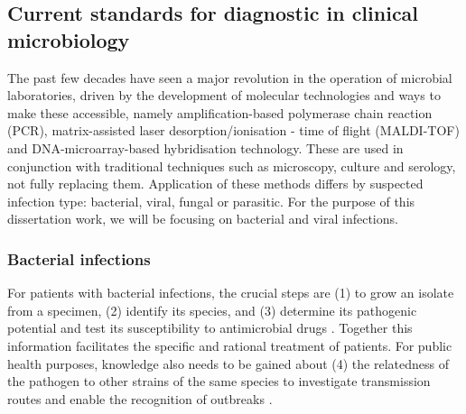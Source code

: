 \subsection{Current standards for diagnostic in clinical microbiology} \label{ssec:current_standards}

The past few decades have seen a major revolution in the operation of microbial laboratories, driven by the development of molecular technologies and ways to make these accessible, namely amplification-based polymerase chain reaction (PCR), matrix-assisted laser desorption/ionisation - time of flight (MALDI-TOF) and DNA-microarray-based hybridisation technology. 
These are used in conjunction with traditional techniques such as microscopy, culture and serology, not fully replacing them.
Application of these methods differs by suspected infection type: bacterial, viral, fungal or parasitic. 
For the purpose of this dissertation work, we will be focusing on bacterial and viral infections.

\subsubsection{Bacterial infections} \label{sssec:bacterial}

For patients with bacterial infections, the crucial steps are (1) to grow an isolate from a specimen, (2) identify its species, and (3) determine its pathogenic potential and test its susceptibility to antimicrobial drugs  \citep{didelot_transforming_2012}. 
Together this information facilitates the specific and rational treatment of patients. 
For public health purposes, knowledge also needs to be gained about (4) the relatedness of the pathogen to other strains of the same species to investigate transmission routes and enable the recognition of outbreaks \citep{foxman_choosing_2005}. 

